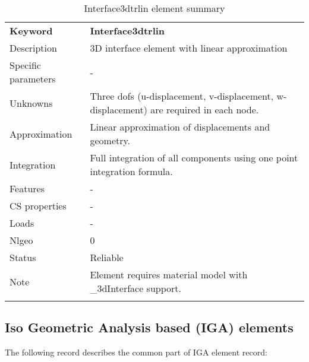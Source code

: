 \documentclass[a4paper]{article}
\newcommand{\param}[1]{\texttt{#1}} %
\newcommand{\templabel}{}%
\newcommand{\tempcaption}{}%
\newcounter{nelpar}
\newenvironment{elementsummary}[5]{%
  \gdef\tempcaption{#4}%
  \gdef\templabel{#5}%
  \setcounter{nelpar}{0}%
  \begin{center} %
    \begin{table}[!htb] %
      \begin{tabular}{|l|p{9cm}|}\hline %
        {\bf Keyword} & \bf{#1}\\ %
        {Description} & {#2}\\ %
        {Specific parameters} & {#3}\\ \hline %
}{
  \\ \hline %
      \end{tabular}%
      \caption{\tempcaption}%
      \label{\templabel}%
    \end{table}%
  \end{center}%
}
\newcommand{\elementParam}[1]{%
  \ifthenelse{\value{nelpar}>0} %
             {&{#1}}%
             {\setcounter{nelpar}{1}Parameters&{#1}}%
             \\%
}
\newcommand{\elementDescription}[2]{{#1} & {#2}\\ }
\begin{document}
\begin{elementsummary}{Interface3dtrlin}{3D  interface element with linear approximation}{-}{Interface3dtrlin element summary}{Interface3dtrlinsummary}
\elementDescription{Unknowns}{Three dofs (u-displacement, v-displacement, w-displacement) are required in each node.}
\elementDescription{Approximation}{Linear approximation of displacements and geometry.}
\elementDescription{Integration}{Full integration of all components using one point integration formula.}
\elementDescription{Features}{-}
\elementDescription{CS properties}{-}
\elementDescription{Loads}{-}
\elementDescription{Nlgeo}{0}
\elementDescription{Status}{Reliable}
\elementDescription{Note}{Element requires material model with \_3dInterface support.}
\end{elementsummary}

\clearpage
\subsection{Iso Geometric Analysis based (IGA) elements}
The following record describes the common part of IGA element record:
 
\end{document}
